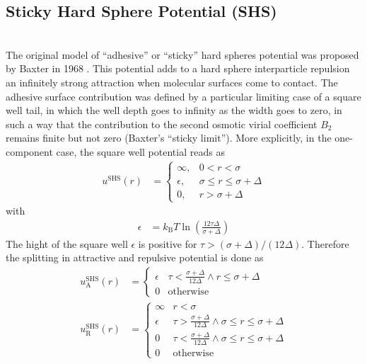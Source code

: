  \newpage
\subsection{Sticky Hard Sphere Potential (SHS)}
~\\

The original model of ``adhesive'' or ``sticky'' hard
spheres potential was proposed by Baxter in 1968 \cite{Baxter1968}.
This potential adds to a hard sphere interparticle repulsion an infinitely
strong attraction when molecular surfaces come to contact.
The adhesive surface contribution was defined by a particular
limiting case of a square well tail, in which the well depth goes to
infinity as the width goes to zero, in such a way that the contribution
to the second osmotic virial coefficient $B_2$ remains finite but not
zero (Baxter's ``sticky limit''). More explicitly, in the one-component case,
the square well potential reads as
\begin{align}
u^\text{SHS}(r) &=
\begin{cases}
\infty,   & 0 < r <    \sigma \\
\epsilon, & \sigma \leq r \leq \sigma+\Delta \\
0,        & r > \sigma+\Delta
\end{cases}
\end{align}
with
\begin{align}
\epsilon &= k_\text{B} T \ln\left( \frac{12\tau\Delta}{\sigma+\Delta} \right)
\end{align}
The hight of the square well $\epsilon$ is positive for $\tau>(\sigma+\Delta)/(12\Delta)$.
Therefore the splitting in attractive and repulsive potential is done as
\begin{align}
u^\text{SHS}_\text{A}(r) &=
\begin{cases}
\epsilon & \tau < \frac{\sigma+\Delta}{12\Delta} \wedge r \leq \sigma+\Delta \\
0        & \mbox{otherwise}
\end{cases}
\\
u^\text{SHS}_\text{R}(r) &=
\begin{cases}
\infty & r < \sigma \\
\epsilon  & \tau > \frac{\sigma+\Delta}{12\Delta} \wedge \sigma \leq r \leq \sigma+\Delta \\
0         & \tau < \frac{\sigma+\Delta}{12\Delta} \wedge \sigma \leq r \leq \sigma+\Delta \\
0         & \mbox{otherwise}
\end{cases}
\end{align}
